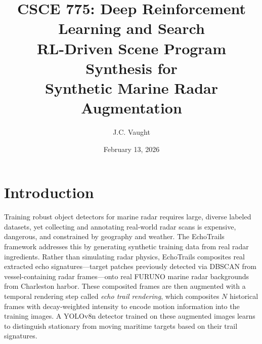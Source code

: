 \documentclass[12pt]{article}
\title{
\textbf{CSCE 775: Deep Reinforcement Learning and Search} \\[0.5em]
\Large RL-Driven Scene Program Synthesis for \\
Synthetic Marine Radar Augmentation
}
\author{
J.C. Vaught
}
\date{February 13, 2026}
\begin{document}
\maketitle

\section{Introduction}

Training robust object detectors for marine radar requires large, diverse labeled datasets, yet collecting and annotating real-world radar scans is expensive, dangerous, and constrained by geography and weather. The EchoTrails framework addresses this by generating synthetic training data from real radar ingredients. Rather than simulating radar physics, EchoTrails composites real extracted echo signatures---target patches previously detected via DBSCAN from vessel-containing radar frames---onto real FURUNO marine radar backgrounds from Charleston harbor. These composited frames are then augmented with a temporal rendering step called \textit{echo trail rendering}, which composites $N$ historical frames with decay-weighted intensity to encode motion information into the training images. A YOLOv8n detector trained on these augmented images learns to distinguish stationary from moving maritime targets based on their trail signatures.
\end{document}

